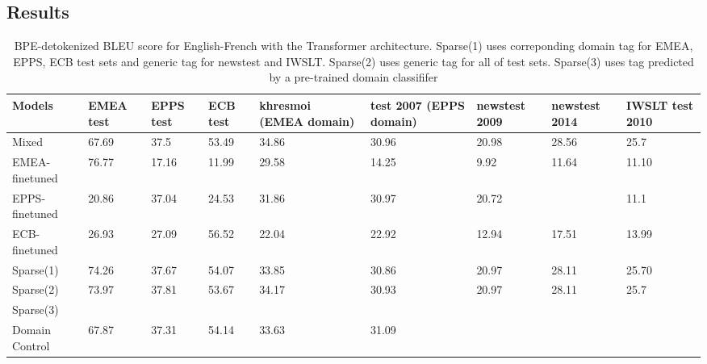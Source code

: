 \documentclass[11pt,a4paper]{article}
\begin{document}
\subsection{Results}
\begin{table}
\begin{center}
 \begin{tabularx}{\textwidth}{|| X | X | X | X | X | X | X | X | X ||} 
 \hline
 Models & EMEA test & EPPS test & ECB test & khresmoi (EMEA domain) & test 2007 (EPPS domain) & newstest 2009 & newstest 2014 & IWSLT test 2010 \\ [0.5ex] 
 \hline\hline
 Mixed & 67.69 & 37.5 & 53.49 & 34.86 & 30.96 & 20.98 & 28.56 & 25.7 \\
 \hline
 EMEA-finetuned & 76.77 & 17.16 & 11.99 & 29.58 & 14.25 & 9.92 & 11.64 & 11.10 \\
 \hline
 EPPS-finetuned & 20.86 & 37.04 & 24.53 & 31.86 & 30.97 & 20.72 &  & 11.1 \\
 \hline
 ECB-finetuned & 26.93 & 27.09 & 56.52 & 22.04 & 22.92 & 12.94 & 17.51 & 13.99 \\
 \hline
 Sparse(1) & 74.26 & 37.67 & 54.07 & 33.85 & 30.86 & 20.97 & 28.11 & 25.70 \\
 \hline
 Sparse(2) & 73.97 & 37.81 & 53.67 & 34.17 & 30.93 & 20.97 & 28.11 & 25.7 \\
 \hline
 Sparse(3) &  &  &  &  &  &  &  & \\
 \hline
 Domain Control & 67.87 & 37.31 & 54.14 & 33.63 & 31.09 &  & & \\
 \hline
\end{tabularx}
\end{center}

\caption{BPE-detokenized BLEU score for English-French with the Transformer architecture. Sparse(1) uses correponding domain tag for EMEA, EPPS, ECB test sets and generic tag for newstest and IWSLT. Sparse(2) uses generic tag for all of test sets. Sparse(3) uses tag predicted by a pre-trained domain classififer}
\label{tab:1}
\end{table}
\end{document}
